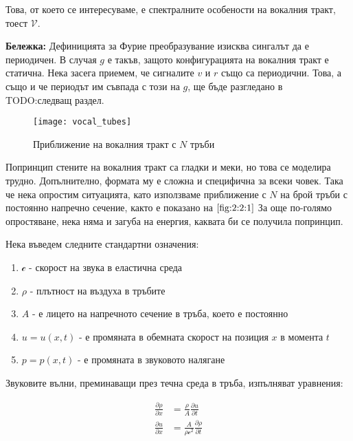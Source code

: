 \documentclass[main.tex]{subfiles}
\begin{document}
Това, от което се интересуваме, е спектралните особености на вокалния тракт, тоест $\mathcal{V}$.

\begin{footnotesize}
    \textbf{Бележка:} Дефиницията за Фурие преобразувание изисква сингалът да е периодичен. В случая $g$ е такъв, защото конфигурацията на вокалния тракт е статична. Нека засега приемем, че сигналите $v$ и $r$ също са периодични. Това, а също и че периодът им съвпада с този на $g$, ще бъде разгледано в TODO:следващ раздел.
\end{footnotesize}

\begin{figure}[ht]%
    \texttt{[image: vocal\_tubes]}%
    \caption{Приближение на вокалния тракт с $N$ тръби}%
    \label{fig:2:2:1}
\end{figure}

Попринцип стените на вокалния тракт са гладки и меки, но това се моделира трудно. Допълнително, формата му е сложна и специфична за всеки човек. Така че нека опростим ситуацията, като използваме приближение с $N$ на брой тръби с постоянно напречно сечение, както е показано на $\autoref{fig:2:2:1}$
За още по-голямо опростяване, нека няма и загуба на енергия, каквата би се получила попринцип.


Нека въведем следните стандартни означения:
\begin{enumerate}
    \item{$\mathcal{c}$} - скорост на звука в еластична среда
    \item{$\rho$} - плътност на въздуха в тръбите
    \item{$A$} - е лицето на напречното сечение в тръба, което е постоянно
    \item{$u = u(x, t)$} - е промяната в обемната скорост на позиция $x$ в момента $t$
    \item{$p = p(x, t)$} - е промяната в звуковото налягане
\end{enumerate}

Звуковите вълни, преминаващи през течна среда в
тръба, изпълняват уравнения:

\begin{subequations}
    \label{eq:tubes:01}
    \begin{flalign}
        \frac{\partial\rho}{\partial x} & = \frac{\rho}{A} \frac{\partial u}{\partial t}\\
        \frac{\partial u}{\partial x} & = \frac{A}{\rho \mathcal{c}^2} \frac{\partial \rho}{\partial t}
    \end{flalign}
\end{subequations}
\end{document}
